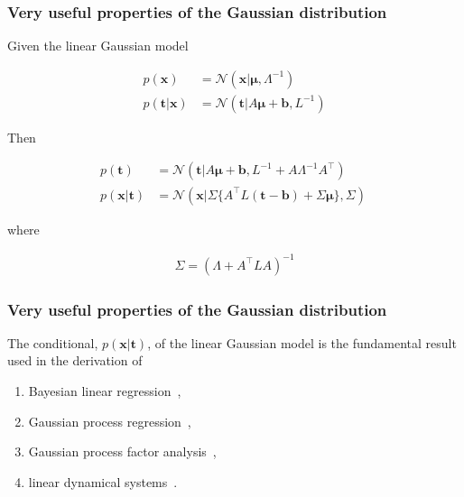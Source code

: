 \documentclass[11pt]{beamer}
\begin{document}
\begin{frame}
    \frametitle{Very useful properties of the Gaussian distribution \citep{bishop06}}

	\small
	\begin{theorem}

		Given the linear Gaussian model

		\begin{align*}
			p(\mathbf{x})&=\mathcal{N}(\mathbf{x}|\boldsymbol{\mu},\Lambda^{-1})\\
			p(\mathbf{t}|\mathbf{x})&=\mathcal{N}(\mathbf{t}|A\boldsymbol{\mu}+\mathbf{b},L^{-1})
		\end{align*}

		Then

		\begin{align}
            p(\mathbf{t})&=\mathcal{N}(\mathbf{t}|A\boldsymbol{\mu}+\mathbf{b},L^{-1}+A\Lambda^{-1}A^\intercal)\label{eq:marginalLinearGaussianModel}\\
			p(\mathbf{x}|\mathbf{t})&=\mathcal{N}(\mathbf{x}|\Sigma\{A^\intercal L(\mathbf{t}-\mathbf{b})+\Sigma\boldsymbol{\mu}\},\Sigma)~\label{eq:conditionalLinearGaussianModel}
		\end{align}

		where

		\begin{align*}
			\Sigma=(\Lambda+A^\intercal LA)^{-1}
		\end{align*}

	\end{theorem}
	\normalsize
\end{frame}

\begin{frame}
    \frametitle{Very useful properties of the Gaussian distribution \citep{bishop06}}

	The conditional, $p(\mathbf{x}|\mathbf{t})$, of the linear Gaussian model is the fundamental result used in the derivation of

	\begin{enumerate}

		\item Bayesian linear regression~\citep{bishop06},

		\item Gaussian process regression~\citep{williamsAndRasmussen06},

		\item Gaussian process factor analysis~\citep{yuEtAl09},

		\item linear dynamical systems~\citep{durbinAndKoopman12}.

	\end{enumerate}

\end{frame}
\end{document}
